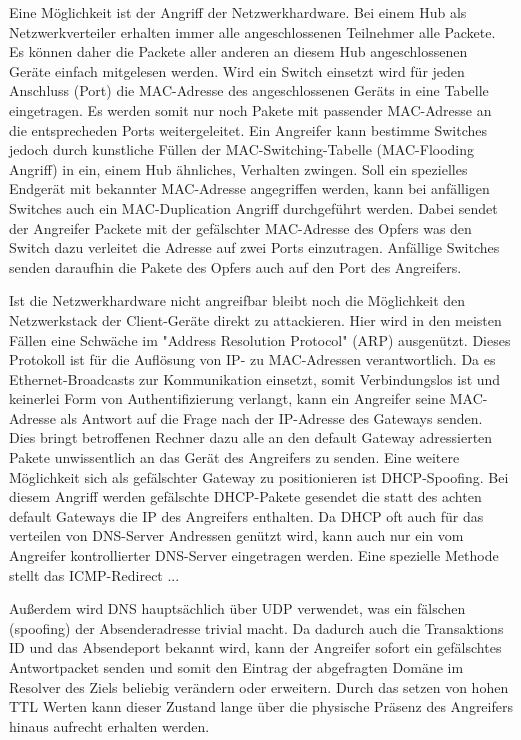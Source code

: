 Eine Möglichkeit ist der Angriff der Netzwerkhardware. Bei einem Hub als Netzwerkverteiler erhalten immer alle angeschlossenen Teilnehmer alle Packete. Es können daher die Packete aller anderen an diesem Hub angeschlossenen Geräte einfach mitgelesen werden. Wird ein Switch einsetzt wird für jeden Anschluss (Port) die MAC-Adresse des angeschlossenen Geräts in eine Tabelle eingetragen. Es werden somit nur noch Pakete mit passender MAC-Adresse an die entsprecheden Ports weitergeleitet. Ein Angreifer kann bestimme Switches jedoch durch kunstliche Füllen der MAC-Switching-Tabelle (MAC-Flooding Angriff) in ein, einem Hub ähnliches, Verhalten zwingen. Soll ein spezielles Endgerät mit bekannter MAC-Adresse angegriffen werden, kann bei anfälligen Switches auch ein MAC-Duplication Angriff durchgeführt werden. Dabei sendet der Angreifer Packete mit der gefälschter MAC-Adresse des Opfers was den Switch dazu verleitet die Adresse auf zwei Ports einzutragen. Anfällige Switches senden daraufhin die Pakete des Opfers auch auf den Port des Angreifers.

Ist die Netzwerkhardware nicht angreifbar bleibt noch die Möglichkeit den Netzwerkstack der Client-Geräte direkt zu attackieren. Hier wird in den meisten Fällen eine Schwäche im "Address Resolution Protocol" (ARP) ausgenützt. Dieses Protokoll ist für die Auflösung von IP- zu MAC-Adressen verantwortlich. Da es Ethernet-Broadcasts zur Kommunikation einsetzt, somit Verbindungslos ist und keinerlei Form von Authentifizierung verlangt, kann ein Angreifer seine MAC-Adresse als Antwort auf die Frage nach der IP-Adresse des Gateways senden. Dies bringt betroffenen Rechner dazu alle an den default Gateway adressierten Pakete unwissentlich an das Gerät des Angreifers zu senden. Eine weitere Möglichkeit sich als gefälschter Gateway zu positionieren ist DHCP-Spoofing. Bei diesem Angriff werden gefälschte DHCP-Pakete gesendet die statt des achten default Gateways die IP des Angreifers enthalten. Da DHCP oft auch für das verteilen von DNS-Server Andressen genützt wird, kann auch nur ein vom Angreifer kontrollierter DNS-Server eingetragen werden. Eine spezielle Methode stellt das ICMP-Redirect ...

Außerdem wird DNS hauptsächlich über UDP verwendet, was ein fälschen (spoofing) der Absenderadresse trivial macht. Da dadurch auch die Transaktions ID und das Absendeport bekannt wird, kann der Angreifer sofort ein gefälschtes Antwortpacket senden und somit den Eintrag der abgefragten Domäne im Resolver des Ziels beliebig verändern oder erweitern. Durch das setzen von hohen TTL Werten kann dieser Zustand lange über die physische Präsenz des Angreifers hinaus aufrecht erhalten werden.

